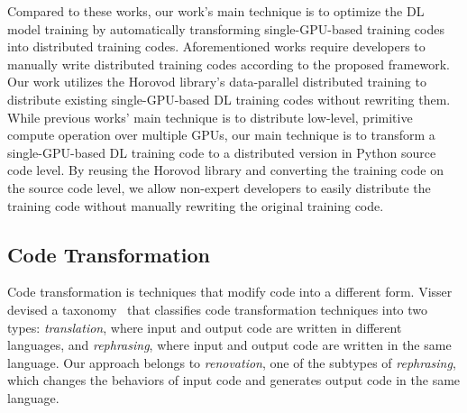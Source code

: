 \begin{inred}
Compared to these works, 
our work's main technique is to optimize the DL model training by
automatically transforming single-GPU-based training codes into distributed training codes.
Aforementioned works require developers to manually write distributed training codes
according to the proposed framework.
Our work utilizes the Horovod library’s data-parallel distributed training to 
distribute existing single-GPU-based DL training codes without rewriting them.
While previous works’ main technique is to distribute low-level, 
primitive compute operation over multiple GPUs, 
our main technique is to transform a single-GPU-based DL training code 
to a distributed version in Python source code level. 
By reusing the Horovod library and converting the training code on the source code level, 
we allow non-expert developers to easily distribute the training code without manually rewriting the original training code.



\end{inred}

\subsection{Code Transformation}

Code transformation is techniques that modify code into a different form.  
Visser devised a taxonomy~\cite{visser2001survey} that classifies code transformation
techniques into two types: 
\textit{translation}, where input and output code are written in different
languages, and \textit{rephrasing}, where input and output code are written in
the same language.
Our approach belongs to \textit{renovation}, one of the subtypes of
\textit{rephrasing}, which changes the behaviors of input code and generates
output code in the same language.


